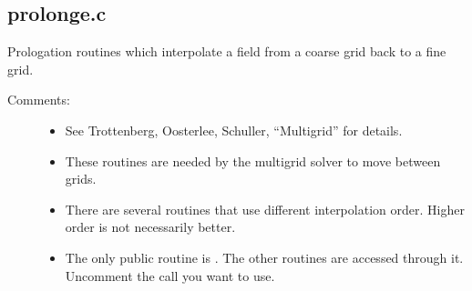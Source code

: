 \documentclass[letterpaper,10pt,english]{sphinxmanual}
\begin{document}
\begin{fulllineitems}
\label{\detokenize{sphinx-c-apidoc/output/gravity/newton/calc_newt_source_c:c.calc_newt_source}}%
\pysigstartmultiline
{}%
\pysigstopmultiline
\end{fulllineitems}



\subsection{prolonge.c}
\label{\detokenize{sphinx-c-apidoc/output/gravity/prolonge_c:prolonge-c}}\label{\detokenize{sphinx-c-apidoc/output/gravity/prolonge_c::doc}}
Prologation routines which interpolate a field from a coarse grid back to a fine grid.
\begin{description}
\item[{Comments:}] \leavevmode\begin{itemize}
\item {} 
See Trottenberg, Oosterlee, Schuller, “Multigrid” for details.

\item {} 
These routines are needed by the multigrid solver to move between grids.

\item {} 
There are several routines that use different interpolation order.  Higher order is not necessarily better.

\item {} 
The only public routine is .  The other routines are accessed through it.  Uncomment the call you want to use.

\end{itemize}

\end{description}

\begin{fulllineitems}
\label{\detokenize{sphinx-c-apidoc/output/gravity/prolonge_c:c.pow2}}%
\pysigstartmultiline
{}%
\pysigstopmultiline
\end{fulllineitems}
\end{document}
